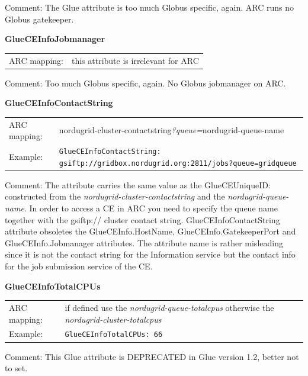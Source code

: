 \documentclass{article}
\begin{document}
Comment: The Glue attribute is too much Globus specific, again. 
ARC runs no Globus gatekeeper. 


\hspace*{0.5cm}
\begin{shaded}
 \textbf{GlueCEInfoJobmanager} 
\end{shaded}
\begin{tabular}{lp{10cm}}  
  ARC mapping:& this attribute is irrelevant for ARC\\   
\end{tabular}

Comment: Too much Globus specific, again. No Globus jobmanager on ARC.


\hspace*{0.5cm}
\begin{shaded}
 \textbf{GlueCEInfoContactString} 
\end{shaded}
\begin{tabular}{lp{10cm}}  
  ARC mapping:& nordugrid-cluster-contactstring{\it ?queue=}nordugrid-queue-name\\
  Example:& \verb#GlueCEInfoContactString: gsiftp://gridbox.nordugrid.org:2811/jobs?queue=gridqueue#\\
\end{tabular}

Comment: The attribute carries the same value as the GlueCEUniqueID: 
constructed from the {\it nordugrid-cluster-contactstring} and 
the {\it nordugrid-queue-name}. In order to access a CE in ARC you need to 
specify the queue name together with the gsiftp:// cluster contact string.
GlueCEInfoContactString attribute obsoletes the GlueCEInfo.HostName, 
GlueCEInfo.GatekeeperPort and GlueCEInfo.Jobmanager attributes.
The attribute name is rather misleading since it is not the contact string for
the Information service but the contact info for the job submission service
of the CE.


\hspace*{0.5cm}
\begin{shaded}
 \textbf{GlueCEInfoTotalCPUs} 
\end{shaded}
\begin{tabular}{lp{10cm}}  
  ARC mapping:& if defined use the {\it nordugrid-queue-totalcpus} otherwise the 
    {\it nordugrid-cluster-totalcpus}\\
  Example:& \verb#GlueCEInfoTotalCPUs: 66#\\
\end{tabular}

Comment: This Glue attribute is DEPRECATED in Glue version 1.2, better 
not to set.
\end{document}
